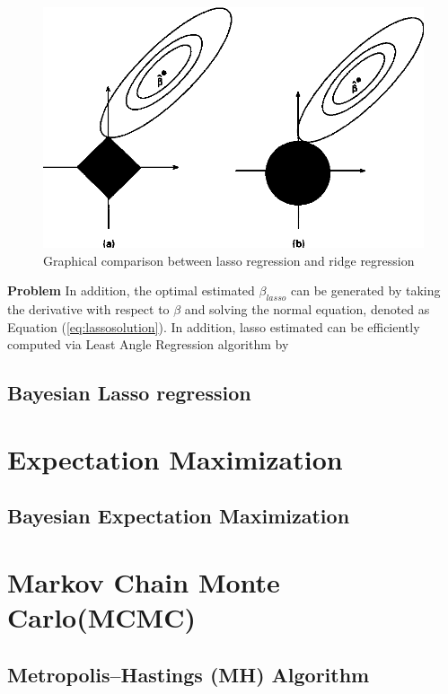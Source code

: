 \begin{figure}
	\includegraphics[width=\linewidth]{lassodemo}
	\caption{Graphical comparison between lasso regression and ridge regression}
	\label{fig:lassodemo}
\end{figure}

\textbf{Problem}
In addition, the optimal estimated $\beta_{lasso}$ can be generated by taking the derivative with respect to $\beta$ and solving the normal equation, denoted as Equation (\ref{eq:lassosolution}).
In addition, lasso estimated can be efficiently computed via Least Angle Regression algorithm by

\subsection{Bayesian Lasso regression}


\section{Expectation Maximization}
\subsection{Bayesian Expectation Maximization}

\section{Markov Chain Monte Carlo(MCMC)}
\label{MCMC}

\subsection{Metropolis–Hastings (MH) Algorithm}
